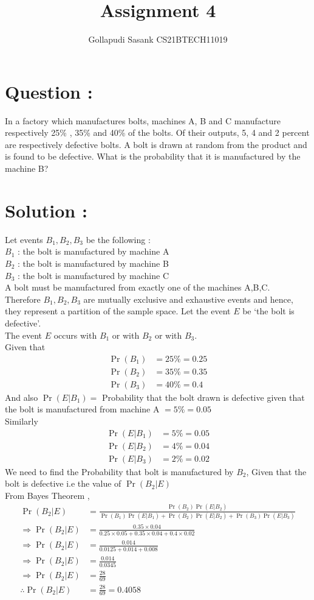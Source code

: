 \documentclass[journal,twocolumn]{IEEEtran}
\title{Assignment 4}
\author{Gollapudi Sasank CS21BTECH11019}
\providecommand{\pr}[1]{\ensuremath{\Pr\left(#1\right)}}
\begin{document}
\maketitle
\section*{Question : }
In a factory which manufactures bolts, machines A, B and C manufacture
respectively 25\% , 35\% and 40\% of the bolts. Of their outputs, 5, 4 and 2 percent are respectively defective bolts. A bolt is drawn at random from the product and is found to be defective. What is the probability that it is manufactured by the machine B?
\section*{Solution : }
Let  events $B_1,B_2,B_3$ be the following : \\
$B_1$ : the bolt is manufactured by machine A \\
$B_2$ : the bolt is manufactured by machine B \\
$B_3$ : the bolt is manufactured by machine C \\
A bolt must be manufactured from exactly one of the machines A,B,C.\\
Therefore $B_1,B_2,B_3$ are mutually exclusive and exhaustive events and hence, they represent a partition of the sample space.
Let the event $E$ be `the bolt is defective'.\\
The event $E$ occurs with $B_1$ or with $B_2$ or with $B_3$.\\
Given that 
\begin{align}
\pr{B_1} &= 25\% = 0.25 \\
\pr{B_2} &= 35\% = 0.35 \\
\pr{B_3} &= 40\% = 0.4 
\end{align} 
And also $\pr{E|B_1} = $ Probability that the bolt drawn is defective given that the bolt is manufactured from machine A $ = 5\% = 0.05 $ \\
Similarly
\begin{align}
\pr{E|B_1} &= 5\% = 0.05 \\
\pr{E|B_2} &= 4\% = 0.04 \\
\pr{E|B_3} &= 2\% = 0.02
\end{align}
We need to find the Probability that bolt is manufactured by $B_2$, Given that the bolt is defective i.e  the value of $\pr{B_2|E}$ \\
From Bayes Theorem , \\
\begin{align}
\pr{B_2|E} &= \frac{\pr{B_2}\pr{E|B_2}}{\pr{B_1}\pr{E|B_1}+\pr{B_2}\pr{E|B_2}+\pr{B_3}\pr{E|B_3}} \\
\Rightarrow \pr{B_2|E} &= \frac{0.35 \times 0.04}{0.25 \times 0.05 + 0.35 \times 0.04 + 0.4 \times 0.02 } \\
\Rightarrow \pr{B_2|E} &= \frac{0.014}{0.0125+0.014+0.008} \\
\Rightarrow \pr{B_2|E} &= \frac{0.014}{0.0345} \\ 
\Rightarrow \pr{B_2|E} &= \frac{28}{69} \\ 
\therefore \pr{B_2|E} &= \frac{28}{69} = 0.4058 
\end{align}
\end{document}
